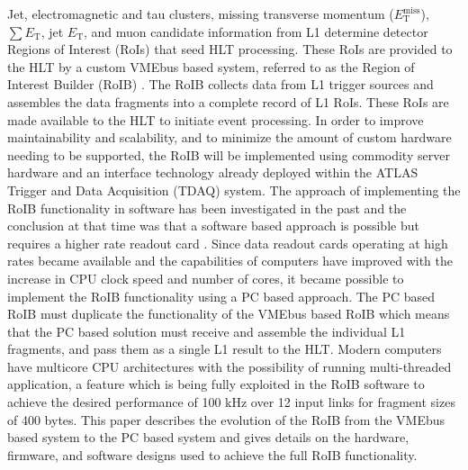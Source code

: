 \documentclass{JINST}
\begin{document}
Jet, electromagnetic and tau clusters, missing transverse momentum ($E_{\mathrm{T}}^{\mathrm{miss}}$), $\sum E_{\mathrm{T}}$, 
jet $E_{\mathrm{T}}$, and muon candidate information from L1 determine detector Regions of Interest (RoIs) that seed HLT processing. These RoIs are provided to the HLT by a custom VMEbus based system, referred to as the Region of Interest Builder (RoIB) \cite{vme_roib}.
The RoIB collects data from L1 
trigger sources and assembles the data fragments into a complete record of L1 RoIs. These RoIs are made available to the HLT to initiate event processing. In order to improve maintainability and scalability, and to minimize the amount of custom hardware needing to be supported, 
the RoIB will be implemented using commodity server hardware and an interface technology already deployed 
within the ATLAS Trigger and Data Acquisition (TDAQ) system. The approach of implementing the RoIB functionality in software has been investigated in the past 
and the conclusion at that time was that a software based approach is possible but requires a higher rate readout card \cite{swroib_past}. 
Since data readout cards operating at high rates became available and the capabilities of computers have improved with the increase 
in CPU clock speed and number of cores, it became possible to implement the RoIB functionality using a PC based approach. 
The PC based RoIB must duplicate the functionality of the VMEbus based RoIB which means that the PC based solution must receive and assemble the
individual L1 fragments, and pass them as a single L1 result to the HLT. Modern computers have multicore CPU architectures 
with the possibility of running multi-threaded application, a feature which is being fully exploited in the RoIB software to achieve 
the desired performance of 100 kHz over 12 input links for fragment sizes of 400 bytes.  
This paper describes the evolution of the RoIB from the VMEbus based system to the PC based system and gives details on the hardware, 
firmware, and software designs used to achieve the full RoIB functionality. 
\end{document}
